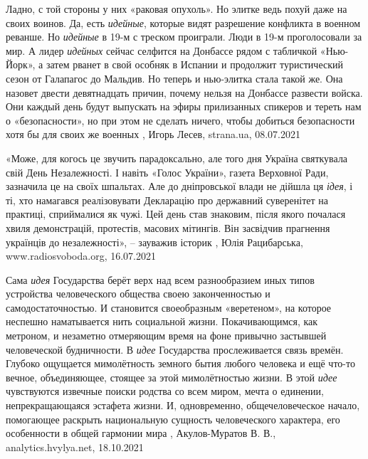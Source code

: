 Ладно, с той стороны у них «раковая опухоль». Но элитке ведь похуй даже на
своих воинов.  Да, есть \emph{идейные}, которые видят разрешение конфликта в
военном реванше.  Но \emph{идейные} в 19-м с треском проиграли. Люди в 19-м
проголосовали за мир.  А лидер \emph{идейных} сейчас селфится на Донбассе рядом
с табличкой «Нью-Йорк», а затем рванет в свой особняк в Испании и продолжит
туристический сезон от Галапагос до Мальдив.  Но теперь и нью-элитка стала
такой же. Она назовет двести девятнадцать причин, почему нельзя на Донбассе
развести войска.  Они каждый день будут выпускать на эфиры прилизанных спикеров
и тереть нам о «безопасности», но при этом не сделать ничего, чтобы добиться
безопасности хотя бы для своих же военных
, 
Игорь Лесев, strana.ua, 08.07.2021

«Може, для когось це звучить парадоксально, але того дня Україна святкувала
свій День Незалежності. І навіть «Голос України», газета Верховної Ради,
зазначила це на своїх шпальтах. Але до дніпровської влади не дійшла ця
\emph{ідея}, і ті, хто намагався реалізовувати Декларацію про державний
суверенітет на практиці, сприймалися як чужі. Цей день став знаковим, після
якого почалася хвиля демонстрацій, протестів, масових мітингів. Він засвідчив
прагнення українців до незалежності», – зауважив історик
, 
Юлія Рацибарська, www.radiosvoboda.org, 16.07.2021

Сама \emph{идея} Государства берёт верх над всем разнообразием иных типов устройства
человеческого общества своею законченностью и самодостаточностью. И становится
своеобразным «веретеном», на которое неспешно наматывается нить социальной
жизни. Покачивающимся, как метроном, и незаметно отмеряющим время на фоне
привычно застывшей человеческой будничности.  В \emph{идее} Государства прослеживается
связь времён. Глубоко ощущается мимолётность земного бытия любого человека и
ещё что-то вечное, объединяющее, стоящее за этой мимолётностью жизни. В этой
\emph{идее} чувствуются извечные поиски родства со всем миром, мечта о единении,
непрекращающаяся эстафета жизни. И, одновременно, общечеловеческое начало,
помогающее раскрыть национальную сущность человеческого характера, его
особенности в общей гармонии мира
, 
Акулов-Муратов В. В., analytics.hvylya.net, 18.10.2021

